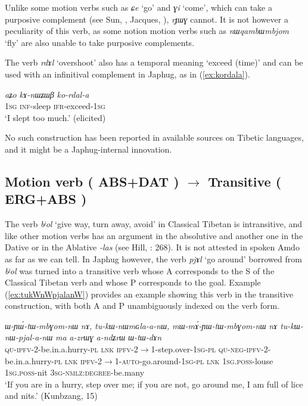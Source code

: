 \documentclass[oneside,a4paper,11pt]{article}
\makeatletter
\newcommand{\ipa}[1]{{\phon\textit{\mbox{#1}}}} %
\newcommand{\refb}[1]{(\ref{#1})}
\def\fakesc#1{%
  \begingroup%
  \xdef\fake@name{\csname\curr@fontshape/\f@size\endcsname}%
  \fontsize{\fontdimen8\fake@name}{\baselineskip}\selectfont%
  \uppercase{#1}%
  \endgroup%
}
\makeatother
\begin{document}
Unlike some motion verbs such as \ipa{ɕe} `go' and \ipa{ɣi} `come', which can take a purposive complement (see Sun, \citeyear{sun12complementation}, Jacques, \citeyear{jacques13harmonization}), \ipa{rɟɯɣ} cannot. It is not however a peculiarity of this verb, as some notion motion verbs such as \ipa{nɯqambɯmbjom} `fly' are also unable to take purposive complements.

The verb \ipa{rdɤl} `overshoot' also has a temporal meaning `exceed (time)' and can be used with an infinitival complement in Japhug, as in \refb{ex:kordala}.

\begin{exe}
\ex \label{ex:kordala}
\gll
\ipa{aʑo}  	\ipa{kɤ-nɯʑɯβ}  	\ipa{ko-rdal-a}  \\
\textsc{1sg} \textsc{inf}-sleep \textsc{ifr}-exceed-\textsc{1sg} \\
\glt `I slept too much.' (elicited)
\end{exe}

No such construction has been reported in available sources on Tibetic languages, and it might be a Japhug-internal innovation.

\subsection{Motion verb (\fakesc{abs+dat}) $\rightarrow$ Transitive (\fakesc{erg+abs})}  
The verb \ipa{bʲol} `give way, turn away, avoid' in Classical Tibetan is intransitive, and like other motion verbs has an argument in the absolutive and another one in the Dative or in the Ablative \ipa{-las} (see Hill, \citeyear{hill10dictionary}: 268). It is not attested in spoken Amdo as far as we can tell. In Japhug however, the verb \ipa{pjɤl} `go around' borrowed from  \ipa{bʲol} was turned into a transitive verb whose A corresponds to the S of the Classical Tibetan verb and whose P corresponds to the goal. Example \refb{ex:tukWnWpjalanW} provides an example  showing this verb in the transitive construction, with both A and P unambiguously indexed on the verb form.


\begin{exe}
\ex \label{ex:tukWnWpjalanW}
\gll
\ipa{ɯ-ɲɯ́-tɯ-mbɣom-nɯ}  	\ipa{nɤ,}  	\ipa{tu-kɯ-nɯmɢla-a-nɯ,}  \ipa{mɯ-mɤ́-ɲɯ-tɯ-mbɣom-nɯ}  	\ipa{nɤ}  	\ipa{tu-kɯ-nɯ-pjal-a-nɯ}  	\ipa{ma}  	\ipa{a-zrɯɣ}  	\ipa{a-ndʑrɯ}  	\ipa{ɯ-tɯ-dɤn} \\
\textsc{qu-ipfv}-2-be.in.a.hurry-\textsc{pl} \textsc{lnk} \textsc{ipfv}-2$\rightarrow$1-step.over-\textsc{1sg-pl} \textsc{qu-neg-ipfv}-2-be.in.a.hurry-\textsc{pl} \textsc{lnk} \textsc{ipfv}-2$\rightarrow$1-\textsc{auto}-go.around-\textsc{1sg-pl} \textsc{lnk}   \textsc{1sg.poss}-louse \textsc{1sg.poss}-nit \textsc{3sg-nmlz:degree}-be.many \\
\glt `If you are in a hurry, step over me; if you are not, go around me, I am full of lice and nits.' (Kunbzang, 15)
\end{exe}
\end{document}
